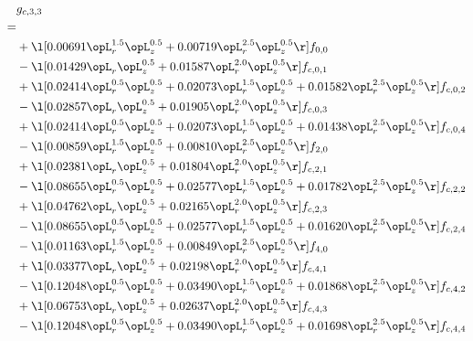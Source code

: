 \begin{alignat}{2} 
\label{eq:g_33_0} 
& g_{c,3,3} \nonumber \\ 
 = \\ 
& + \l[  0.00691 \opL_r^{1.5} \opL_z^{0.5} +  0.00719 \opL_r^{2.5} \opL_z^{0.5}  \r] f_{0,0} \nonumber \\ 
& - \l[  0.01429 \opL_r \opL_z^{0.5} +  0.01587 \opL_r^{2.0} \opL_z^{0.5}  \r] f_{c,0,1} \nonumber \\ 
& + \l[  0.02414 \opL_r^{0.5} \opL_z^{0.5} +  0.02073 \opL_r^{1.5} \opL_z^{0.5} +  0.01582 \opL_r^{2.5} \opL_z^{0.5}  \r] f_{c,0,2} \nonumber \\ 
& - \l[  0.02857 \opL_r \opL_z^{0.5} +  0.01905 \opL_r^{2.0} \opL_z^{0.5}  \r] f_{c,0,3} \nonumber \\ 
& + \l[  0.02414 \opL_r^{0.5} \opL_z^{0.5} +  0.02073 \opL_r^{1.5} \opL_z^{0.5} +  0.01438 \opL_r^{2.5} \opL_z^{0.5}  \r] f_{c,0,4} \nonumber \\ 
& - \l[  0.00859 \opL_r^{1.5} \opL_z^{0.5} +  0.00810 \opL_r^{2.5} \opL_z^{0.5}  \r] f_{2,0} \nonumber \\ 
& + \l[  0.02381 \opL_r \opL_z^{0.5} +  0.01804 \opL_r^{2.0} \opL_z^{0.5}  \r] f_{c,2,1} \nonumber \\ 
& - \l[  0.08655 \opL_r^{0.5} \opL_z^{0.5} +  0.02577 \opL_r^{1.5} \opL_z^{0.5} +  0.01782 \opL_r^{2.5} \opL_z^{0.5}  \r] f_{c,2,2} \nonumber \\ 
& + \l[  0.04762 \opL_r \opL_z^{0.5} +  0.02165 \opL_r^{2.0} \opL_z^{0.5}  \r] f_{c,2,3} \nonumber \\ 
& - \l[  0.08655 \opL_r^{0.5} \opL_z^{0.5} +  0.02577 \opL_r^{1.5} \opL_z^{0.5} +  0.01620 \opL_r^{2.5} \opL_z^{0.5}  \r] f_{c,2,4} \nonumber \\ 
& - \l[  0.01163 \opL_r^{1.5} \opL_z^{0.5} +  0.00849 \opL_r^{2.5} \opL_z^{0.5}  \r] f_{4,0} \nonumber \\ 
& + \l[  0.03377 \opL_r \opL_z^{0.5} +  0.02198 \opL_r^{2.0} \opL_z^{0.5}  \r] f_{c,4,1} \nonumber \\ 
& - \l[  0.12048 \opL_r^{0.5} \opL_z^{0.5} +  0.03490 \opL_r^{1.5} \opL_z^{0.5} +  0.01868 \opL_r^{2.5} \opL_z^{0.5}  \r] f_{c,4,2} \nonumber \\ 
& + \l[  0.06753 \opL_r \opL_z^{0.5} +  0.02637 \opL_r^{2.0} \opL_z^{0.5}  \r] f_{c,4,3} \nonumber \\ 
& - \l[  0.12048 \opL_r^{0.5} \opL_z^{0.5} +  0.03490 \opL_r^{1.5} \opL_z^{0.5} +  0.01698 \opL_r^{2.5} \opL_z^{0.5}  \r] f_{c,4,4} \nonumber \\ 
\end{alignat} 


